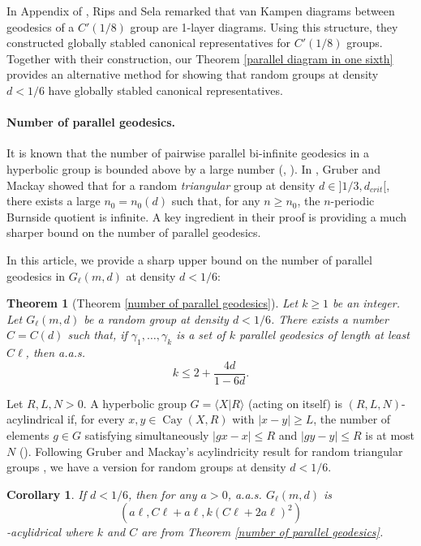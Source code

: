 \documentclass[a4paper]{article}
\DeclareMathOperator{\Cay}{Cay}
\newcommand\Pres[2]{\langle #1 | #2 \rangle}
\newtheorem*{thm*}{Theorem}
\newtheorem*{cor*}{Corollary}
\theoremstyle{remark}
\begin{document}
In Appendix of \cite{RS95}, Rips and Sela remarked that van Kampen diagrams between geodesics of a $C'(1/8)$ group are 1-layer diagrams. Using this structure, they constructed globally stabled canonical representatives for $C'(1/8)$ groups. Together with their construction, our Theorem \ref{parallel diagram in one sixth} provides an alternative method for showing that random groups at density $d<1/6$ have globally stabled canonical representatives.

\paragraph{Number of parallel geodesics.} It is known that the number of pairwise parallel bi-infinite geodesics in a hyperbolic group is bounded above by a large number (\cite{Gro87}, \cite[Proposition 3.1]{Del96}). In \cite{GM18}, Gruber and Mackay showed that for a random \textit{triangular} group at density $d\in]1/3,d_{crit}[$, there exists a large $n_0 = n_0(d)$ such that, for any $n\geq n_0$, the $n$-periodic Burnside quotient is infinite. A key ingredient in their proof is providing a much sharper bound on the number of parallel geodesics.

In this article, we provide a sharp upper bound on the number of parallel geodesics in $G_\ell(m,d)$ at density $d<1/6$:
\begin{thm*}[Theorem \ref{number of parallel geodesics}] Let $k\geq 1$ be an integer. Let $G_\ell(m,d)$ be a random group at density $d<1/6$. There exists a number $C=C(d)$ such that, if $\gamma_1,\dots,\gamma_k$ is a set of $k$ parallel geodesics of length at least $C\ell$, then a.a.s.
\[k\leq 2+\frac{4d}{1-6d}.\]
\end{thm*}

\quad

Let $R, L, N >0$. A hyperbolic group $G=\Pres{X}{R}$ (acting on itself) is $(R,L,N)$-acylindrical if, for every $x,y\in \Cay(X,R)$ with $|x-y|\geq L$, the number of elements $g\in G$ satisfying simultaneously $|gx-x|\leq R$ and $|gy-y|\leq R$ is at most $N$ (\cite[Definition 5.5]{Cou18}). Following Gruber and Mackay's acylindricity result for random triangular groups \cite[Proof of Theorem 1.5 by Proposition 1.3]{GM18}, we have a version for random groups at density $d<1/6$.

\begin{cor*} If $d<1/6$, then for any $a>0$, a.a.s. $G_\ell(m,d)$ is \[(a\ell, C\ell+a\ell, k(C\ell+2a\ell)^2)\]-acylidrical where $k$ and $C$ are from Theorem \ref{number of parallel geodesics}.
\end{cor*}
\end{document}
